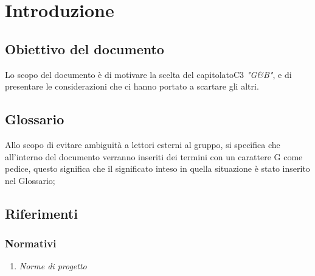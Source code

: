 \section{Introduzione}
	\subsection{Obiettivo del documento}
		Lo scopo del documento è di motivare la scelta del capitolato\pedice C3 \textit{"G\&B"}, e di presentare le considerazioni che ci hanno portato a scartare gli altri.
	\subsection{Glossario}
		Allo scopo di evitare ambiguità a lettori esterni al gruppo, si specifica che all'interno del documento verranno inseriti dei termini con un carattere G come pedice, questo significa che il significato inteso in quella situazione è stato inserito nel Glossario;
		\subsection{Riferimenti}
			\subsubsection{Normativi}
				\begin{enumerate}
					\item \textit{Norme di progetto}
				\end{enumerate}
